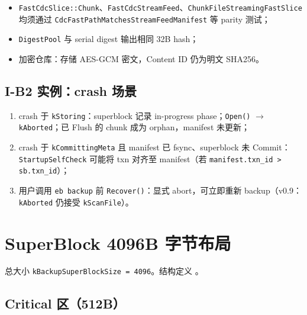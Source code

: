 \begin{itemize}[nosep]
  \item \texttt{FastCdcSlice::Chunk}、\texttt{FastCdcStreamFeed}、\texttt{ChunkFileStreamingFastSlice} 均须通过 \texttt{CdcFastPathMatchesStreamFeedManifest} 等 parity 测试；
  \item \texttt{DigestPool} 与 serial digest 输出相同 32B hash；
  \item 加密仓库：存储 AES-GCM 密文，Content ID 仍为明文 SHA256。
\end{itemize}

\subsection{I-B2 实例：crash 场景}

\begin{enumerate}[nosep]
  \item crash 于 \texttt{kStoring}：superblock 记录 in-progress phase；\texttt{Open()} $\rightarrow$ \texttt{kAborted}；已 Flush 的 chunk 成为 orphan，manifest 未更新；
  \item crash 于 \texttt{kCommittingMeta} 且 manifest 已 fsync、superblock 未 Commit：\texttt{StartupSelfCheck} 可能将 txn 对齐至 manifest（若 \texttt{manifest.txn\_id > sb.txn\_id}）；
  \item 用户调用 \texttt{eb backup} 前 \texttt{Recover()}：显式 abort，可立即重新 backup（v0.9：\texttt{kAborted} 仍接受 \texttt{kScanFile}）。
\end{enumerate}

\section{SuperBlock 4096B 字节布局}

总大小 \texttt{kBackupSuperBlockSize = 4096}。结构定义 。

\subsection{Critical 区（512B）}

